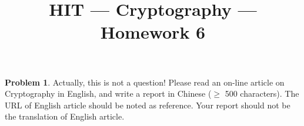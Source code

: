 \documentclass[11pt]{article}
\title{HIT --- Cryptography --- Homework 6}
\theoremstyle{definition}
\newtheorem{problem}{Problem}
\begin{document}
\maketitle

\begin{problem}
Actually, this is not a question! Please read an on-line article on Cryptography in English, and write a report in Chinese ($\ge$ 500 characters). The URL of English article should be noted as reference. Your report should not be the translation of English article. 
\end{problem}
\end{document}
